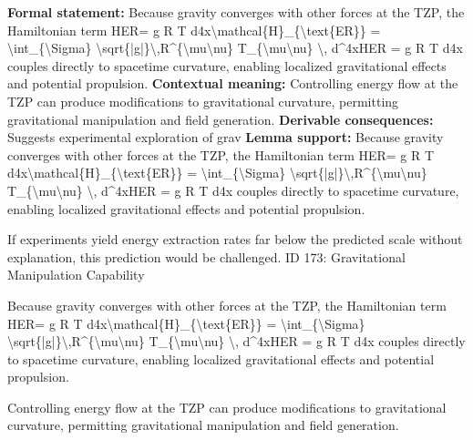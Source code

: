 \begingroup\footnotesize\setlength{\emergencystretch}{3em}\sloppy
\textbf{Formal statement:} Because gravity converges with other forces at the TZP, the Hamiltonian term HER=   g  R  T   d4x\textbackslash{}mathcal\{H\}\_\{\textbackslash{}text\{ER\}\} = \textbackslash{}int\_\{\textbackslash{}Sigma\} \textbackslash{}sqrt\{|g|\}\textbackslash{},R\textasciicircum{}\{\textbackslash{}mu\textbackslash{}nu\} T\_\{\textbackslash{}mu\textbackslash{}nu\} \textbackslash{}, d\textasciicircum{}4xHER =    g  R  T   d4x couples directly to spacetime curvature, enabling localized gravitational effects and potential propulsion.
\textbf{Contextual meaning:} Controlling energy flow at the TZP can produce modifications to gravitational curvature, permitting gravitational manipulation and field generation.
\textbf{Derivable consequences:} Suggests experimental exploration of grav
\textbf{Lemma support:} Because gravity converges with other forces at the TZP, the Hamiltonian term HER=   g  R  T   d4x\textbackslash{}mathcal\{H\}\_\{\textbackslash{}text\{ER\}\} = \textbackslash{}int\_\{\textbackslash{}Sigma\} \textbackslash{}sqrt\{|g|\}\textbackslash{},R\textasciicircum{}\{\textbackslash{}mu\textbackslash{}nu\} T\_\{\textbackslash{}mu\textbackslash{}nu\} \textbackslash{}, d\textasciicircum{}4xHER =    g  R  T   d4x couples directly to spacetime curvature, enabling localized gravitational effects and potential propulsion.\par
\endgroup

If experiments yield energy extraction rates far below the predicted scale without explanation, this prediction would be challenged. ID 173: Gravitational Manipulation Capability

Because gravity converges with other forces at the TZP, the Hamiltonian term HER=   g  R  T   d4x\textbackslash{}mathcal\{H\}\_\{\textbackslash{}text\{ER\}\} = \textbackslash{}int\_\{\textbackslash{}Sigma\} \textbackslash{}sqrt\{|g|\}\textbackslash{},R\textasciicircum{}\{\textbackslash{}mu\textbackslash{}nu\} T\_\{\textbackslash{}mu\textbackslash{}nu\} \textbackslash{}, d\textasciicircum{}4xHER =    g  R  T   d4x couples directly to spacetime curvature, enabling localized gravitational effects and potential propulsion.

Controlling energy flow at the TZP can produce modifications to gravitational curvature, permitting gravitational manipulation and field generation.
\endgroup

